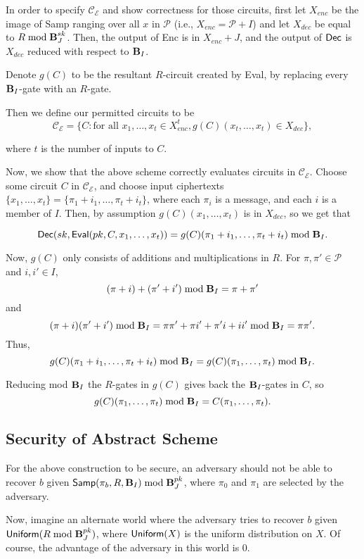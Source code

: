 In order to specify $\mathcal{C}_\mathcal{E}$ and show correctness for those circuits, first let $X_{enc}$ be the image of {\sf Samp} ranging over all $x$ in $\mathcal{P}$ (i.e., $X_{enc} = \mathcal{P} + I$) and let $X_{dec}$ be equal to $R \bmod \textbf{B}_J^{sk}$. Then, the output of {\sf Enc} is in $X_{enc} + J$, and the output of ${\sf Dec}$ is $X_{dec}$ reduced with respect to $\textbf{B}_I$.

Denote $g(C)$ to be the resultant $R$-circuit created by {\sf Eval}, by replacing every $\textbf{B}_I$-gate with an $R$-gate.

Then we define our permitted circuits to be
\[\mathcal{C}_\mathcal{E} = \{C: \text{for all }x_1, \dots, x_t \in X_{enc}^t, g(C)(x_t, \dots, x_t) \in X_{dec}\},\]

where $t$ is the number of inputs to $C$.

Now, we show that the above scheme correctly evaluates circuits in $\mathcal{C}_\mathcal{E}$. Choose some circuit $C$ in $\mathcal{C}_\mathcal{E}$, and choose input ciphertexts $\{x_1, \dots, x_t\} = \{\pi_1 + i_1, \dots, \pi_t + i_t\}$, where each $\pi_i$ is a message, and each $i$ is a member of $I$. Then, by assumption $g(C)(x_1, \dots, x_t)$ is in $X_{dec}$, so we get that

\[{\sf Dec}(sk, {\sf Eval}(pk, C, x_1, \dots, x_t)) = g(C)(\pi_1 + i_1, \dots, \pi_t + i_t) \bmod \textbf{B}_I.\]

Now, $g(C)$ only consists of additions and multiplications in $R$. For $\pi, \pi' \in \mathcal{P}$ and $i, i' \in I$,
\[(\pi + i) + (\pi' + i') \bmod \textbf{B}_I = \pi + \pi'\]
and
\[(\pi + i)(\pi' + i') \bmod \textbf{B}_I = \pi \pi' +\pi i' + \pi' i + i i' \bmod \textbf{B}_I = \pi \pi'.\]
Thus,
\[g(C)(\pi_1 + i_1, \dots, \pi_t + i_t) \bmod \textbf{B}_I = g(C)(\pi_1, \dots, \pi_t) \bmod \textbf{B}_I.\]

Reducing mod $\textbf{B}_I$ the $R$-gates in $g(C)$ gives back the $\textbf{B}_I$-gates in $C$, so
\[g(C)(\pi_1, \dots, \pi_t) \bmod \textbf{B}_I = C(\pi_1, \dots, \pi_t).\]


\subsection{Security of Abstract Scheme}
\label{sec:security}
For the above construction to be secure, an adversary should not be able to recover $b$ given ${\sf Samp}(\pi_b, R, \textbf{B}_I) \bmod \textbf{B}_J^{pk}$, where $\pi_0$ and $\pi_1$ are selected by the adversary.

Now, imagine an alternate world where the adversary tries to recover $b$ given ${\sf Uniform}(R \bmod \textbf{B}_J^{pk})$, where ${\sf Uniform}(X)$ is the uniform distribution on $X$. Of course, the advantage of the adversary in this world is $0$.

